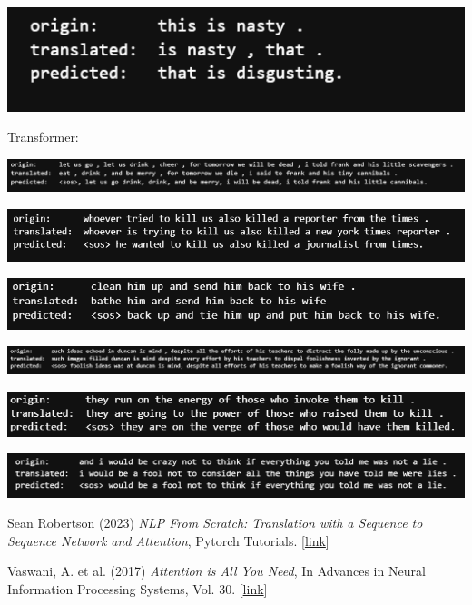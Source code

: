 \documentclass{article}
\begin{document}
\includegraphics[scale=0.45]{figures/Attention_result_5.png}

Transformer:

\includegraphics[scale=0.42]{figures/Transformer_result_1.png}

\includegraphics[scale=0.42]{figures/Transformer_result_2.png}

\includegraphics[scale=0.42]{figures/Transformer_result_3.png}

\includegraphics[scale=0.5]{figures/Transformer_result_4.png}

\includegraphics[scale=0.45]{figures/Transformer_result_5.png}

\includegraphics[scale=0.42]{figures/Transformer_result_6.png}

\begin{thebibliography}{2}
Sean Robertson (2023) \emph{NLP From Scratch: Translation with a Sequence to Sequence Network and Attention}, Pytorch Tutorials. [\href{https://pytorch.org/tutorials/intermediate/seq2seq_translation_tutorial.html}{link}]

Vaswani, A. et al. (2017) \emph{Attention is All You Need}, In Advances in Neural Information Processing Systems, Vol. 30. [\href{https://papers.nips.cc/paper_files/paper/2017/hash/3f5ee243547dee91fbd053c1c4a845aa-Abstract.html}{link}]

\end{thebibliography}
\end{document}
